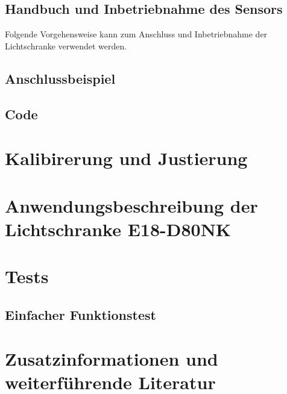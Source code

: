 \subsection{Handbuch und Inbetriebnahme des Sensors}
Folgende Vorgehensweise kann zum Anschluss und Inbetriebnahme der Lichtschranke verwendet werden. 


\subsection{Anschlussbeispiel}



\subsection{Code}




\section{Kalibirerung und Justierung}




\section{Anwendungsbeschreibung der Lichtschranke E18-D80NK}



\section{Tests}

\subsection{Einfacher Funktionstest}


\begin{center}
\end{center}


%
\section{Zusatzinformationen und weiterführende Literatur }


